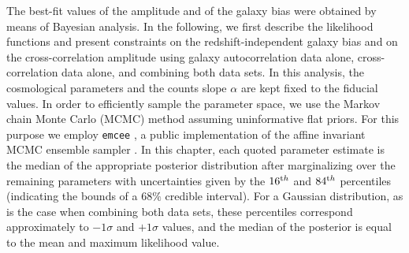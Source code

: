 The best-fit values of the amplitude and of the galaxy bias were obtained by means of Bayesian analysis. In the following, we first describe the likelihood functions and present constraints on the redshift-independent galaxy bias and on the cross-correlation amplitude using galaxy autocorrelation data alone, cross-correlation data alone, and combining both data sets. In this analysis, the cosmological parameters and the counts slope $\alpha$ are kept fixed to the fiducial values. In order to efficiently sample the parameter space, we use the Markov chain Monte Carlo (MCMC) method assuming uninformative flat priors. For this purpose we employ \texttt{emcee} \citep{Foreman-Mackey2013}, a public implementation of the affine invariant MCMC ensemble sampler \citep{Goodman2010}.  In this chapter, each quoted parameter estimate is the median of the appropriate posterior distribution after marginalizing over the remaining parameters with uncertainties given by the $16^{\rm th}$ and $84^{\rm th}$ percentiles (indicating the bounds of a $68\%$ credible interval). For a Gaussian distribution, as is the case when combining both data sets, these percentiles correspond approximately to $-1\sigma$ and $+1\sigma$ values, and the median of the posterior is equal to the mean and maximum likelihood value.
%
